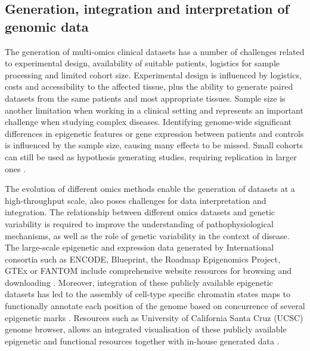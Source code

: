 
\subsection{Generation, integration and interpretation of genomic data}

The generation of multi-omics clinical datasets has a number of challenges related to experimental design, availability of suitable patients, logistics for sample processing and limited cohort size. Experimental design is influenced by logistics, costs and accessibility to the affected tissue, plus the ability to generate paired datasets from the same patients and most appropriate tissues. Sample size is another limitation when working in a clinical setting and represents an important challenge when studying complex diseases. Identifying genome-wide significant differences in epigenetic features or gene expression between patients and controls is influenced by the sample size, causing many effects to be missed. Small cohorts can still be used as hypothesis generating studies, requiring replication in larger ones \parencite{Hackshaw2008}.

The evolution of different omics methods enable the generation of datasets at a high-throughput scale, also poses challenges for data interpretation and integration. The relationship between different omics datasets and genetic variability is required to improve the understanding of pathophysiological mechanisms, as well as the role of genetic variability in the context of disease. The large-scale epigenetic and expression data generated by International consortia such as ENCODE, Blueprint, the Roadmap Epigenomics Project, GTEx or FANTOM include comprehensive website resources for browsing and downloading \parencite{ENCODE2007,Lonsdale2013, FANTOM2014,Adams2012}. Moreover, integration of these publicly available epigenetic datasets has led to the assembly of cell-type specific chromatin states maps to functionally annotate each position of the genome based on concurrence of several epigenetic marks \parencite{Ernst2010, Ernst2011,Hoffman2013, Kundaje2015}. Resources such as University of California Santa Cruz (UCSC) genome browser, allows an integrated visualisation of these publicly available epigenetic and functional resources together with in-house generated data \parencite{Kent2002}.



